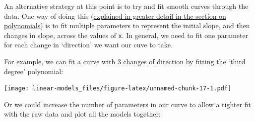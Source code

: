 \documentclass[]{article}
\newenvironment{Shaded}{\begin{snugshade}}{\end{snugshade}}
\newcommand{\KeywordTok}[1]{\textcolor[rgb]{0.13,0.29,0.53}{\textbf{#1}}}
\newcommand{\DataTypeTok}[1]{\textcolor[rgb]{0.13,0.29,0.53}{#1}}
\newcommand{\DecValTok}[1]{\textcolor[rgb]{0.00,0.00,0.81}{#1}}
\newcommand{\StringTok}[1]{\textcolor[rgb]{0.31,0.60,0.02}{#1}}
\newcommand{\OperatorTok}[1]{\textcolor[rgb]{0.81,0.36,0.00}{\textbf{#1}}}
\newcommand{\NormalTok}[1]{#1}
\theoremstyle{definition}
\theoremstyle{definition}
\theoremstyle{definition}
\theoremstyle{remark}
\begin{document}
An alternative strategy at this point is to try and fit smooth curves
through the data. One way of doing this
(\protect\hyperlink{polynomials}{explained in greater detail in the
section on polynomials}) is to fit multiple parameters to represent the
initial slope, and then changes in slope, across the values of
\texttt{x}. In general, we need to fit one parameter for each change in
`direction' we want our cuve to take.

For example, we can fit a curve with 3 changes of direction by fitting
the `third degree' polynomial:

\begin{Shaded}
\end{Shaded}

\texttt{[image: linear-models\_files/figure-latex/unnamed-chunk-17-1.pdf]}

Or we could increase the number of parameters in our curve to allow a
tighter fit with the raw data and plot all the models together:
\end{document}
